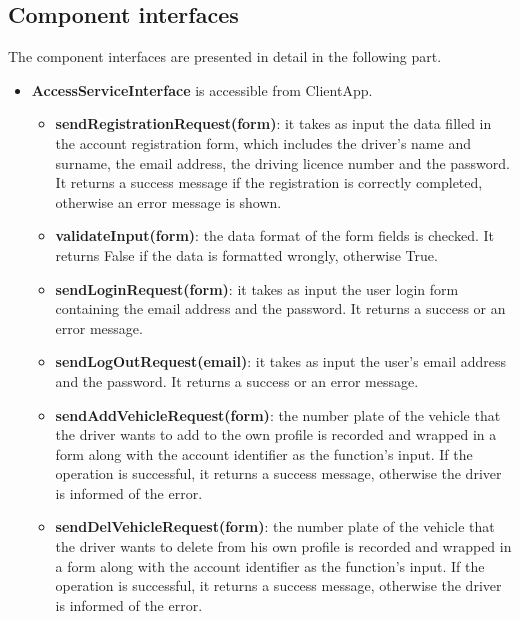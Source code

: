 \documentclass[../main.tex]{subfiles}
\begin{document}
\subsection{Component interfaces}
The component interfaces are presented in detail in the following part.
\begin{itemize}
    \item \textbf{AccessServiceInterface} is accessible from ClientApp.
    \begin{itemize}
        \item \textbf{sendRegistrationRequest(form)}: it takes as input the data filled in the account registration form, which includes the driver's name and surname, the email address, the driving licence number and the password. It returns a success message if the registration is correctly completed, otherwise an error message is shown.
        \item \textbf{validateInput(form)}: the data format of the form fields is checked. It returns False if the data is formatted wrongly, otherwise True.
        \item \textbf{sendLoginRequest(form)}: it takes as input the user login form containing the email address and the password. It returns a success or an error message.
        \item \textbf{sendLogOutRequest(email)}: it takes as input the user's email address and the password. It returns a success or an error message.
        \item \textbf{sendAddVehicleRequest(form)}: the number plate of the vehicle that the driver wants to add to the own profile is recorded and wrapped in a form along with the account identifier as the function's input. If the operation is successful, it returns a success message, otherwise the driver is informed of the error.
        \item \textbf{sendDelVehicleRequest(form)}: the number plate of the vehicle that the driver wants to delete from his own profile is recorded and wrapped in a form along with the account identifier as the function's input. If the operation is successful, it returns a success message, otherwise the driver is informed of the error. 
    \end{itemize}


\end{itemize}
\end{document}
